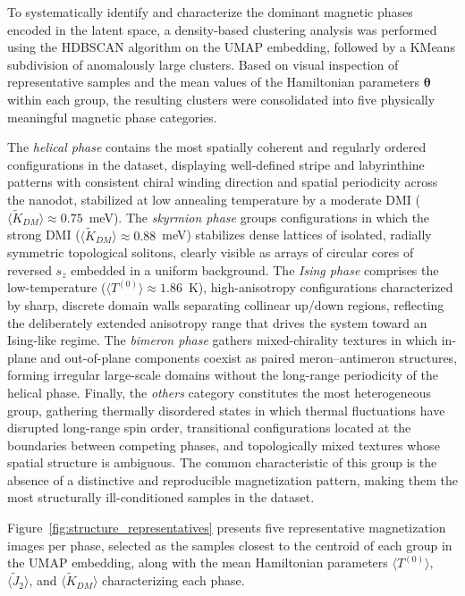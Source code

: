 \documentclass[letterpaper, 12, one column]{article}
\begin{document}
To systematically identify and characterize the dominant magnetic 
phases encoded in the latent space, a density-based clustering 
analysis was performed using the HDBSCAN algorithm on the UMAP 
embedding, followed by a KMeans subdivision of anomalously large 
clusters. Based on visual inspection of representative samples 
and the mean values of the Hamiltonian parameters 
$\boldsymbol{\theta}$ within each group, the resulting clusters
were consolidated into five physically meaningful magnetic phase
categories.

The \textit{helical phase} contains the most spatially coherent and regularly ordered configurations in the dataset, displaying well-defined stripe and labyrinthine patterns with consistent chiral winding direction and spatial periodicity across the nanodot, stabilized at low annealing temperature by a moderate DMI ($\langle\tilde{K}_{DM}\rangle \approx 0.75$~meV). The \textit{skyrmion phase} groups configurations in which the strong DMI ($\langle\tilde{K}_{DM}\rangle \approx 0.88$~meV) stabilizes dense lattices of isolated, radially symmetric topological solitons, clearly visible as arrays of circular cores of reversed $s_z$ embedded in a uniform background. The \textit{Ising phase} comprises the low-temperature ($\langle T^{(0)}\rangle \approx 1.86$~K), high-anisotropy configurations characterized by sharp, discrete domain walls separating collinear up/down regions, reflecting the deliberately extended anisotropy range that drives the system toward an Ising-like regime. The \textit{bimeron phase} gathers mixed-chirality textures in which in-plane and out-of-plane components coexist as paired meron--antimeron structures, forming irregular large-scale domains without the long-range periodicity of the helical phase. Finally, the \textit{others} category constitutes the most heterogeneous group, gathering thermally disordered states in which thermal fluctuations have disrupted long-range spin order, transitional configurations located at the boundaries between competing phases, and topologically mixed textures whose spatial structure is ambiguous. The common characteristic of this group is the absence of a distinctive and reproducible magnetization pattern, making them the most structurally ill-conditioned samples in the dataset.

Figure~\ref{fig:structure_representatives} presents five 
representative magnetization images per phase, selected as the 
samples closest to the centroid of each group in the UMAP 
embedding, along with the mean Hamiltonian parameters 
$\langle T^{(0)}\rangle$, $\langle\tilde{J}_2\rangle$, and 
$\langle\tilde{K}_{DM}\rangle$ characterizing each phase.
\end{document}
